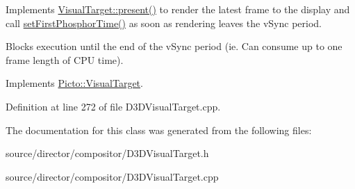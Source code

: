 Implements \hyperlink{class_picto_1_1_visual_target_a914177dc74348568b08aed7dc88648e8}{Visual\-Target\-::present()} to render the latest frame to the display and call \hyperlink{class_picto_1_1_visual_target_abd0a5d10da5c642cb6e31f39635628ed}{set\-First\-Phosphor\-Time()} as soon as rendering leaves the v\-Sync period. 

Blocks execution until the end of the v\-Sync period (ie. Can consume up to one frame length of C\-P\-U time). 

Implements \hyperlink{class_picto_1_1_visual_target_a914177dc74348568b08aed7dc88648e8}{Picto\-::\-Visual\-Target}.



Definition at line 272 of file D3\-D\-Visual\-Target.\-cpp.



The documentation for this class was generated from the following files\-:\begin{DoxyCompactItemize}
\item 
source/director/compositor/D3\-D\-Visual\-Target.\-h\item 
source/director/compositor/D3\-D\-Visual\-Target.\-cpp\end{DoxyCompactItemize}
